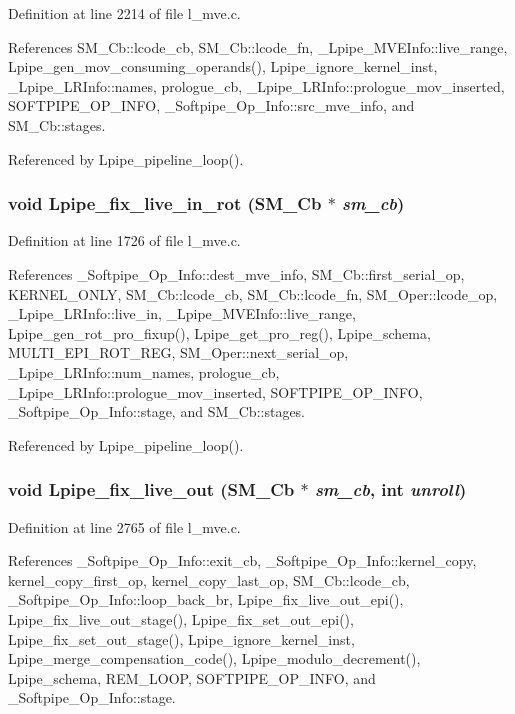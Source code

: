 Definition at line 2214 of file l\_\-mve.c.

References SM\_\-Cb::lcode\_\-cb, SM\_\-Cb::lcode\_\-fn, \_\-Lpipe\_\-MVEInfo::live\_\-range, Lpipe\_\-gen\_\-mov\_\-consuming\_\-operands(), Lpipe\_\-ignore\_\-kernel\_\-inst, \_\-Lpipe\_\-LRInfo::names, prologue\_\-cb, \_\-Lpipe\_\-LRInfo::prologue\_\-mov\_\-inserted, SOFTPIPE\_\-OP\_\-INFO, \_\-Softpipe\_\-Op\_\-Info::src\_\-mve\_\-info, and SM\_\-Cb::stages.

Referenced by Lpipe\_\-pipeline\_\-loop().
\subsubsection{\setlength{\rightskip}{0pt plus 5cm}void Lpipe\_\-fix\_\-live\_\-in\_\-rot (\bf{SM\_\-Cb} $\ast$ {\em sm\_\-cb})}\label{l__mve_8c_bb2be6c164712e95e8e6126203115def}




Definition at line 1726 of file l\_\-mve.c.

References \_\-Softpipe\_\-Op\_\-Info::dest\_\-mve\_\-info, SM\_\-Cb::first\_\-serial\_\-op, KERNEL\_\-ONLY, SM\_\-Cb::lcode\_\-cb, SM\_\-Cb::lcode\_\-fn, SM\_\-Oper::lcode\_\-op, \_\-Lpipe\_\-LRInfo::live\_\-in, \_\-Lpipe\_\-MVEInfo::live\_\-range, Lpipe\_\-gen\_\-rot\_\-pro\_\-fixup(), Lpipe\_\-get\_\-pro\_\-reg(), Lpipe\_\-schema, MULTI\_\-EPI\_\-ROT\_\-REG, SM\_\-Oper::next\_\-serial\_\-op, \_\-Lpipe\_\-LRInfo::num\_\-names, prologue\_\-cb, \_\-Lpipe\_\-LRInfo::prologue\_\-mov\_\-inserted, SOFTPIPE\_\-OP\_\-INFO, \_\-Softpipe\_\-Op\_\-Info::stage, and SM\_\-Cb::stages.

Referenced by Lpipe\_\-pipeline\_\-loop().
\subsubsection{\setlength{\rightskip}{0pt plus 5cm}void Lpipe\_\-fix\_\-live\_\-out (\bf{SM\_\-Cb} $\ast$ {\em sm\_\-cb}, int {\em unroll})}\label{l__mve_8c_be5df0a0e4bf74c50235e9a87e157c37}




Definition at line 2765 of file l\_\-mve.c.

References \_\-Softpipe\_\-Op\_\-Info::exit\_\-cb, \_\-Softpipe\_\-Op\_\-Info::kernel\_\-copy, kernel\_\-copy\_\-first\_\-op, kernel\_\-copy\_\-last\_\-op, SM\_\-Cb::lcode\_\-cb, \_\-Softpipe\_\-Op\_\-Info::loop\_\-back\_\-br, Lpipe\_\-fix\_\-live\_\-out\_\-epi(), Lpipe\_\-fix\_\-live\_\-out\_\-stage(), Lpipe\_\-fix\_\-set\_\-out\_\-epi(), Lpipe\_\-fix\_\-set\_\-out\_\-stage(), Lpipe\_\-ignore\_\-kernel\_\-inst, Lpipe\_\-merge\_\-compensation\_\-code(), Lpipe\_\-modulo\_\-decrement(), Lpipe\_\-schema, REM\_\-LOOP, SOFTPIPE\_\-OP\_\-INFO, and \_\-Softpipe\_\-Op\_\-Info::stage.

